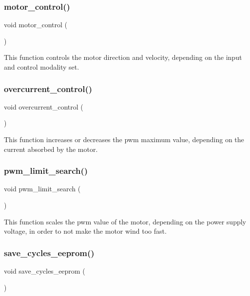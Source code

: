 \subsubsection{motor\+\_\+control()}
{\footnotesize\ttfamily void motor\+\_\+control (\begin{DoxyParamCaption}{ }\end{DoxyParamCaption})}

This function controls the motor direction and velocity, depending on the input and control modality set. \mbox{\label{interruptions_8c_a4e92908805632dc8cab2936d89bb3ba1}} 
\subsubsection{overcurrent\+\_\+control()}
{\footnotesize\ttfamily void overcurrent\+\_\+control (\begin{DoxyParamCaption}{ }\end{DoxyParamCaption})}

This function increases or decreases the pwm maximum value, depending on the current absorbed by the motor. \mbox{\label{interruptions_8c_ab7b287cf5df2ea548297b951be2f20d4}} 
\subsubsection{pwm\+\_\+limit\+\_\+search()}
{\footnotesize\ttfamily void pwm\+\_\+limit\+\_\+search (\begin{DoxyParamCaption}{ }\end{DoxyParamCaption})}

This function scales the pwm value of the motor, depending on the power supply voltage, in order to not make the motor wind too fast. \mbox{\label{interruptions_8c_ad86170580c30277d97216739e8508a13}} 
\subsubsection{save\+\_\+cycles\+\_\+eeprom()}
{\footnotesize\ttfamily void save\+\_\+cycles\+\_\+eeprom (\begin{DoxyParamCaption}{ }\end{DoxyParamCaption})}

